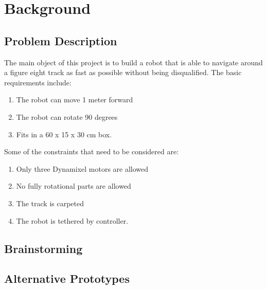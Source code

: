 \documentclass[a4paper, 12pt, oneside]{article} %
\begin{document}
\begin{spacing}{1.5}
\tableofcontents
\end{spacing}
\newpage
\setcounter{page}{1}
\section{Background}
\subsection{Problem Description}
The main object of this project is to build a robot that is able to navigate around a figure eight track as fast as possible without being disqualified. The basic requirements include:
\begin{enumerate} 
\item The robot can move 1 meter forward 
\item The robot can rotate 90 degrees 
\item Fits in a 60 x 15 x 30 cm box.
\end{enumerate} 
Some of the constraints that need to be considered are:
\begin{enumerate} 
\item Only three Dynamixel motors are allowed 
\item No fully rotational parts are allowed 
\item The track is carpeted 
\item The robot is tethered by controller.
\end{enumerate} 
\subsection{Brainstorming}

\subsection{Alternative Prototypes}
\end{document}
